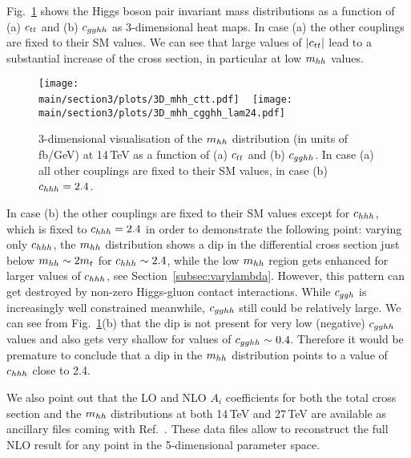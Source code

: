 Fig.~\ref{fig:ctt_3D} shows the Higgs boson pair invariant mass
distributions as a function of (a) $c_{tt}$ and (b) $c_{gghh}$ as 3-dimensional heat maps.
In case (a) the other couplings are fixed to their SM values.
We can see that large values of $|c_{tt}|$ lead to a substantial increase of the cross section, in particular at low $m_{hh}$ values.
%  
\begin{figure}[ht]
\begin{center}
  \texttt{[image: \\main/section3/plots/3D\_mhh\_ctt.pdf]}    
~
\texttt{[image: \\main/section3/plots/3D\_mhh\_cgghh\_lam24.pdf]}
\end{center}
\caption{3-dimensional visualisation of the $m_{hh}$ distribution (in units of fb/GeV) at 14\,TeV as a function of (a) $c_{tt}$  and (b) $c_{gghh}$.  In case (a) all
other couplings are fixed to their SM values, in case (b) $c_{hhh}= 2.4$.}
\label{fig:ctt_3D}
\end{figure}
In case (b) the other couplings are fixed to their SM values except for $c_{hhh}$, which is fixed to $c_{hhh}=2.4$
in order to demonstrate the following point: varying only $c_{hhh}$, the $m_{hh}$ distribution shows a dip in the differential cross section just below $m_{hh}\sim 2m_t$ for $c_{hhh}\sim 2.4$, while the low $m_{hh}$ region gets enhanced for larger values of $c_{hhh}$, see Section~\ref{subsec:varylambda}.
 However, this pattern can get destroyed by non-zero
 Higgs-gluon contact interactions. While $c_{ggh}$ is increasingly well constrained meanwhile,
 $c_{gghh}$ still could be relatively large. We can see from Fig.~\ref{fig:ctt_3D}(b) that the dip is not present for very low (negative) $c_{gghh}$ values and also gets very shallow for values of $c_{gghh}\sim 0.4$.
 Therefore it would be premature to conclude that a dip in the $m_{hh}$ distribution points to a value of $c_{hhh}$ close to 2.4.

We also point out that the LO and NLO $A_i$ coefficients for both the total cross
section and the $m_{hh}$ distributions at both 14\,TeV and 27\,TeV are
available as ancillary files coming with Ref.~\cite{Buchalla:2018yce}. These data files allow to reconstruct the full NLO result for any point in the 5-dimensional parameter space.



